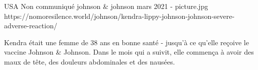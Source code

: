 {USA}
{Non communiqué}
{johnson \& johnson}
{mars 2021}
{-}
{picture.jpg}
{https://nomoresilence.world/johnson/kendra-lippy-johnson-johnson-severe-adverse-reaction/}
{

Kendra était une femme de 38 ans en bonne santé - jusqu'à ce qu'elle reçoive le
vaccine Johnson \& Johnson. Dans le mois qui a suivit, elle commença à avoir des
maux de tête, des douleurs abdominales et des nausées.

}
